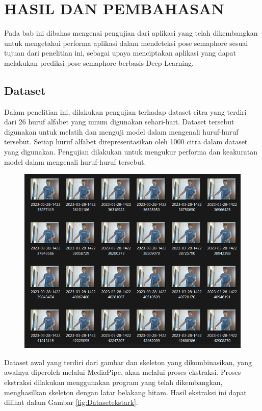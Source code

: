 \chapter{HASIL DAN PEMBAHASAN}
Pada bab ini dibahas mengenai pengujian dari aplikasi yang telah dikembangkan untuk mengetahui performa aplikasi dalam mendeteksi pose semaphore sesuai tujuan dari penelitian ini, sebagai upaya menciptakan aplikasi yang dapat melakukan prediksi pose semaphore berbasis Deep Learning.

\section{Dataset}
Dalam penelitian ini, dilakukan pengujian terhadap dataset citra yang terdiri dari 26 huruf alfabet yang umum digunakan sehari-hari. Dataset tersebut digunakan untuk melatih dan menguji model dalam mengenali huruf-huruf tersebut. Setiap huruf alfabet direpresentasikan oleh 1000 citra dalam dataset yang digunakan. Pengujian dilakukan untuk mengukur performa dan keakuratan model dalam mengenali huruf-huruf tersebut.

\begin{figure}[!hbt]
	\centering
	\includegraphics[width=0.7\linewidth]{gambar/citra_dataset.png}
	\label{fig:Datasetraw}
\end{figure}

Dataset awal yang terdiri dari gambar dan skeleton yang dikombinasikan, yang awalnya diperoleh melalui MediaPipe, akan melalui proses ekstraksi. Proses ekstraksi dilakukan menggunakan program yang telah dikembangkan, menghasilkan skeleton dengan latar belakang hitam. Hasil ekstraksi ini dapat dilihat dalam Gambar \ref{fig:Datasetekstark}.

